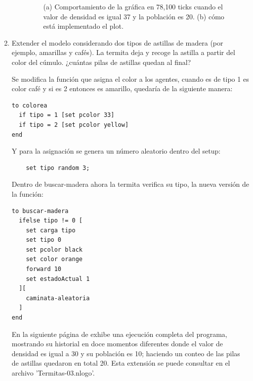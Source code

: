 \begin{enumerate}
\begin{itemize}
\begin{figure}[H]
\begin{tabular}{ccccc}
    \end{tabular}
    \vspace{-10pt}
    \caption{(a) Comportamiento de la gráfica en 78,100 ticks cuando el valor de densidad es igual 37 y la población es 20. (b) cómo está implementado el plot.}
    \label{fig:002}
	\end{figure}
	
	\end{itemize}
	
	\item Extender el modelo considerando dos tipos de astillas de madera (por ejemplo, amarillas y cafés). La termita deja y recoge la astilla a partir del color del cúmulo. ¿cuántas pilas de astillas quedan al final? 
	
	Se modifica la función que asigna el color a los agentes, cuando es de tipo 1 es color café y si es 2 entonces es amarillo, quedaría de la siguiente manera:
	
\begin{verbatim}
to colorea
  if tipo = 1 [set pcolor 33]  
  if tipo = 2 [set pcolor yellow] 
end
\end{verbatim}

Y para la asignación se genera un número aleatorio dentro del setup:

\begin{verbatim}
	set tipo random 3;
\end{verbatim}

Dentro de buscar-madera ahora la termita verifica su tipo, la nueva versión de la función:

\begin{verbatim}
to buscar-madera
  ifelse tipo != 0 [
    set carga tipo
    set tipo 0
    set pcolor black
    set color orange
    forward 10
    set estadoActual 1
  ][
    caminata-aleatoria
  ]
end\end{verbatim}

En la siguiente página de exhibe una ejecución completa del programa, mostrando su historial en doce momentos diferentes donde el valor de densidad es igual a 30 y su población es 10; haciendo un conteo de las pilas de astillas quedaron en total 20. Esta extensión se puede consultar en el archivo 'Termitas-03.nlogo'. 



\end{enumerate}
